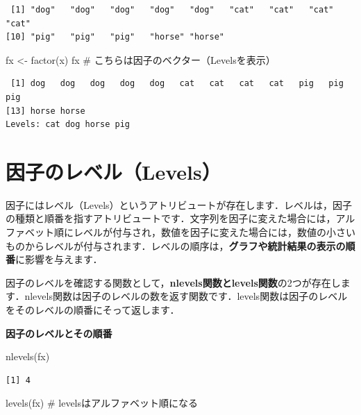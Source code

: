 \documentclass[
  letterpaper,
  DIV=11,
  numbers=noendperiod]{scrreprt}
\newenvironment{Shaded}{\begin{snugshade}}{\end{snugshade}}
\newcommand{\CommentTok}[1]{\textcolor[rgb]{0.37,0.37,0.37}{#1}}
\newcommand{\FunctionTok}[1]{\textcolor[rgb]{0.28,0.35,0.67}{#1}}
\newcommand{\NormalTok}[1]{\textcolor[rgb]{0.00,0.23,0.31}{#1}}
\newcommand{\OtherTok}[1]{\textcolor[rgb]{0.00,0.23,0.31}{#1}}
\begin{document}
\begin{verbatim}
 [1] "dog"   "dog"   "dog"   "dog"   "dog"   "cat"   "cat"   "cat"   "cat"  
[10] "pig"   "pig"   "pig"   "horse" "horse"
\end{verbatim}

\begin{Shaded}
\begin{Highlighting}[]
\NormalTok{fx }\OtherTok{\textless{}{-}} \FunctionTok{factor}\NormalTok{(x)}
\NormalTok{fx }\CommentTok{\# こちらは因子のベクター（Levelsを表示）}
\end{Highlighting}
\end{Shaded}

\begin{verbatim}
 [1] dog   dog   dog   dog   dog   cat   cat   cat   cat   pig   pig   pig  
[13] horse horse
Levels: cat dog horse pig
\end{verbatim}

\hypertarget{ux56e0ux5b50ux306eux30ecux30d9ux30eblevels}{%
\section{因子のレベル（Levels）}\label{ux56e0ux5b50ux306eux30ecux30d9ux30eblevels}}

因子にはレベル（Levels）というアトリビュートが存在します．レベルは，因子の種類と順番を指すアトリビュートです．文字列を因子に変えた場合には，アルファベット順にレベルが付与され，数値を因子に変えた場合には，数値の小さいものからレベルが付与されます．レベルの順序は，\textbf{グラフや統計結果の表示の順番}に影響を与えます．

因子のレベルを確認する関数として，\textbf{nlevels関数とlevels関数}の2つが存在します．nlevels関数は因子のレベルの数を返す関数です．levels関数は因子のレベルをそのレベルの順番にそって返します．

\textbf{因子のレベルとその順番}

\begin{Shaded}
\begin{Highlighting}[]
\FunctionTok{nlevels}\NormalTok{(fx)}
\end{Highlighting}
\end{Shaded}

\begin{verbatim}
[1] 4
\end{verbatim}

\begin{Shaded}
\begin{Highlighting}[]
\FunctionTok{levels}\NormalTok{(fx) }\CommentTok{\# levelsはアルファベット順になる}
\end{Highlighting}
\end{Shaded}
\end{document}
